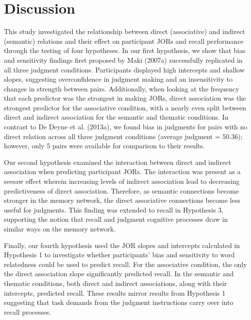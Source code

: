 \documentclass[english,,man]{apa6}
\begin{document}
\hypertarget{discussion}{%
\section{Discussion}\label{discussion}}

This study investigated the relationship between direct (associative) and indirect (semantic) relations and their effect on participant JORs and recall performance through the testing of four hypotheses. In our first hypothesis, we show that bias and sensitivity findings first proposed by Maki (2007a) successfully replicated in all three judgment conditions. Participants displayed high intercepts and shallow slopes, suggesting overconfidence in judgment making and an insensitivity to changes in strength between pairs. Additionally, when looking at the frequency that each predictor was the strongest in making JORs, direct association was the strongest predictor for the associative condition, with a nearly even split between direct and indirect association for the semantic and thematic conditions. In contrast to De Deyne et al. (2013a), we found bias in judgments for pairs with no direct relation across all three judgment conditions (average judgment = 50.36); however, only 5 pairs were available for comparison to their results.

Our second hypothesis examined the interaction between direct and indirect association when predicting participant JORs. The interaction was present as a seesaw effect wherein increasing levels of indirect association lead to decreasing predictiveness of direct association. Therefore, as semantic connections become stronger in the memory network, the direct associative connections become less useful for judgments. This finding was extended to recall in Hypothesis 3, supporting the notion that recall and judgment cognitive processes draw in similar ways on the memory network.

Finally, our fourth hypothesis used the JOR slopes and intercepts calculated in Hypothesis 1 to investigate whether participants' bias and sensitivity to word relatedness could be used to predict recall. For the associative condition, the only the direct association slope significantly predicted recall. In the semantic and thematic conditions, both direct and indirect associations, along with their intercepts, predicted recall. These results mirror results from Hypothesis 1 suggesting that task demands from the judgment instructions carry over into recall processes.
\end{document}
